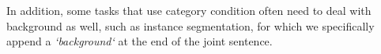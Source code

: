 In addition, some tasks that use category condition often need to deal with background as well, such as instance segmentation, for which we specifically append a \textit{`background`} at the end of the joint sentence. 
\setcounter{table}{13}
\begin{table}[h!]
\footnotesize
\centering
\caption{Detail prompts for all tasks.}
\end{table}

